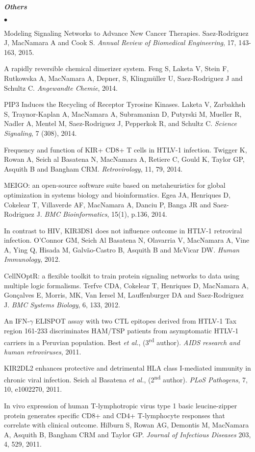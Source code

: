 \documentclass[overlapped, line, 11pt, letterpaper]{res}
\renewenvironment{itemize}{
\begin{list}{$\bullet$}
{\setlength{\itemsep}{0cm}}
}{\end{list}}
\begin{document}
\begin{resume}
\textbf{\emph{Others}}
\begin{itemize}
\item Modeling Signaling Networks to Advance New Cancer Therapies. Saez-Rodriguez J, MacNamara A and Cook S. \emph{Annual Review of Biomedical Engineering}, 17, 143-163, 2015.
\item A rapidly reversible chemical dimerizer system. Feng S, Laketa V, Stein F, Rutkowska A, MacNamara A, Depner, S, Klingm\"uller U, Saez-Rodriguez J and Schultz C. \emph{Angewandte Chemie}, 2014.
\item PIP3 Induces the Recycling of Receptor Tyrosine Kinases. Laketa V, Zarbakhsh S, Traynor-Kaplan A, MacNamara A, Subramanian D, Putyrski M, Mueller R, Nadler A, Mentel M, Saez-Rodriguez J, Pepperkok R, and Schultz C. \emph{Science Signaling}, 7 (308), 2014.
\item Frequency and function of KIR+ CD8+ T cells in HTLV-1 infection. Twigger K, Rowan A, Seich al Basatena N, MacNamara A, Retiere C, Gould K, Taylor GP, Asquith B and Bangham CRM. \emph{Retrovirology}, 11, 79, 2014.
\item MEIGO: an open-source software suite based on metaheuristics for global optimization in systems biology and bioinformatics. Egea JA, Henriques D, Cokelear T, Villaverde AF, MacNamara A, Danciu P, Banga JR and Saez-Rodriguez J. \emph{BMC Bioinformatics}, 15(1), p.136, 2014.
\item In contrast to HIV, KIR3DS1 does not influence outcome in HTLV-1 retroviral infection. O'Connor GM, Seich Al Basatena N, Olavarria V, MacNamara A, Vine A, Ying Q, Hisada M, Galv\~ao-Castro B, Asquith B and McVicar DW. \emph{Human Immunology}, 2012.
\item CellNOptR: a flexible toolkit to train protein signaling networks to data using multiple logic formalisms. Terfve CDA, Cokelear T, Henriques D, MacNamara A, Gon\c{c}alves E, Morris, MK, Van Iersel M, Lauffenburger DA and Saez-Rodriguez J. \emph{BMC Systems Biology}, 6, 133, 2012.
\item An IFN-$\gamma$ ELISPOT assay with two CTL epitopes derived from HTLV-1 Tax region 161-233 discriminates HAM/TSP patients from asymptomatic HTLV-1 carriers in a Peruvian population. Best \emph{et al.}, (3\textsuperscript{rd} author). \emph{AIDS research and human retroviruses}, 2011.
\item KIR2DL2 enhances protective and detrimental HLA class I-mediated immunity in chronic viral infection. Seich al Basatena \emph{et al.}, (2\textsuperscript{nd} author). \emph{PLoS Pathogens}, 7, 10, e1002270, 2011.
\item In vivo expression of human T-lymphotropic virus type 1 basic leucine-zipper protein generates specific CD8+ and CD4+ T-lymphocyte responses that correlate with clinical outcome. Hilburn S, Rowan AG, Demontis M, MacNamara A, Asquith B, Bangham CRM and Taylor GP. \emph{Journal of Infectious Diseases} 203, 4, 529, 2011.
\end{itemize}


\end{resume}
\end{document}
